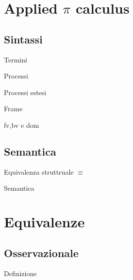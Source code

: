 \documentclass{beamer}
\theoremstyle{plain}
\theoremstyle{definition}
\theoremstyle{remark}
\begin{document}
\section{Applied $\pi$ calculus}

\subsection{Sintassi}

\begin{frame}{Termini}
  
\end{frame}

\begin{frame}{Processi}
  
\end{frame}

\begin{frame}{Processi estesi}
  
\end{frame}

\begin{frame}{Frame}
  
\end{frame}

\begin{frame}{fv,bv e dom}
  
\end{frame}

\subsection{Semantica}

\begin{frame}{Equivalenza struttruale}
  $\equiv$
\end{frame}

\begin{frame}{Semantica}
  
\end{frame}


\section{Equivalenze}

\subsection{Osservazionale}

\begin{frame}{Definizione}
  
\end{frame}
\end{document}

